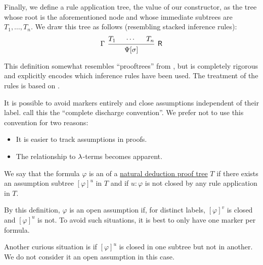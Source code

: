 \begin{definition}
\begin{thmenum}[resume=def:natural_deduction_proof_tree]
    Finally, we define a rule application tree, the value of our constructor, as the tree whose root is the aforementioned node and whose immediate subtrees are \( T_1, \ldots, T_n \). We draw this tree as follows (resembling stacked inference rules):
    \begin{equation*}
      \begin{prooftree}
        \hypo{ T_1 }
        \hypo{ \cdots }
        \hypo{ T_n }
        \infer[left label=\( \Gamma \)]3[\logic{R}]{ \Psi[\sigma] }
      \end{prooftree}
    \end{equation*}
  \end{thmenum}
\end{definition}
\begin{comments}
  \item This definition somewhat resembles \enquote{prooftrees} from , but is completely rigorous and explicitly encodes which inference rules have been used. The treatment of the rules is based on .
  \item It is possible to avoid markers entirely and close assumptions independent of their label.  call this the \enquote{complete discharge convention}. We prefer not to use this convention for two reasons:
  \begin{itemize}
    \item It is easier to track assumptions in proofs.
    \item The relationship to \( \mathrm{\lambda} \)-terms becomes apparent.
  \end{itemize}
\end{comments}

\begin{definition}\label{def:natural_deduction_open_assumptions}\mimprovised
  We say that the formula \( \varphi \) is an  of a \hyperref[def:natural_deduction_proof_tree]{natural deduction proof tree} \( T \) if there exists an assumption subtree \( [\varphi]^u \) in \( T \) and if \( u: \varphi \) is not closed by any rule application in \( T \).
\end{definition}
\begin{comments}
  \item By this definition, \( \varphi \) is an open assumption if, for distinct labels, \( [\varphi]^v \) is closed and \( [\varphi]^u \) is not. To avoid such situations, it is best to only have one marker per formula.
  \item Another curious situation is if \( [\varphi]^u \) is closed in one subtree but not in another. We do not consider it an open assumption in this case.
\end{comments}

